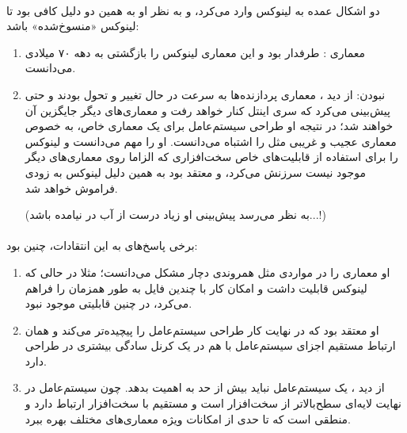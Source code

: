 \documentclass{article}
\begin{document}
	\paragraph*{}
	دو اشکال عمده به لینوکس وارد می‌کرد، و به نظر او به همین دو دلیل کافی بود تا لینوکس «منسوخ‌شده» باشد:

	\begin{enumerate}
		\item {معماری
			:
		}
		طرفدار
		بود و این معماری لینوکس را بازگشتی به دهه ۷۰ میلادی می‌دانست.

		\item{
			نبودن:
		}
		از دید
		،
		معماری پردازنده‌ها به سرعت در حال تغییر و تحول بودند و حتی پیش‌بینی می‌کرد که سری
		اینتل کنار خواهد رفت و معماری‌های دیگر جایگزین آن خواهند شد؛ در نتیجه او طراحی سیستم‌عامل برای یک معماری خاص، به خصوص معماری عجیب و غریبی مثل
		را اشتباه می‌دانست. او
		را مهم می‌دانست و لینوکس را برای استفاده از قابلیت‌های خاص سخت‌افزاری
		که الزاما روی معماری‌های دیگر موجود نیست سرزنش می‌کرد، و معتقد بود به همین دلیل لینوکس به زودی فراموش خواهد شد.

		(به نظر می‌رسد پیش‌بینی او زیاد درست از آب در نیامده باشد...!)
	\end{enumerate}

	\paragraph*{}
	برخی پاسخ‌های
	به این انتقادات، چنین بود:

	\begin{enumerate}
		\item
		او معماری
		را در مواردی مثل همروندی دچار مشکل می‌دانست؛ مثلا در حالی که لینوکس قابلیت
		داشت و امکان کار با چندین فایل به طور همزمان را فراهم می‌کرد، در
		چنین قابلیتی موجود نبود.

		\item
		او معتقد بود که
		در نهایت کار طراحی سیستم‌عامل را پیچیده‌تر می‌کند و همان ارتباط مستقیم اجزای سیستم‌عامل با هم در یک کرنل
		سادگی بیشتری در طراحی دارد.

		\item
		از دید
		،
		یک سیستم‌عامل نباید بیش از حد به
		اهمیت بدهد. چون سیستم‌عامل در نهایت لایه‌ای سطح‌بالاتر از سخت‌افزار است و مستقیم با سخت‌افزار ارتباط دارد و منطقی است که تا حدی از امکانات ویژه معماری‌های مختلف بهره ببرد.


	\end{enumerate}


	\paragraph*{}
\end{document}
